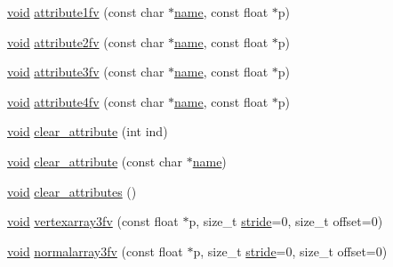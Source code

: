 \begin{DoxyCompactItemize}
\item 
\hyperlink{namespacetrimesh_a784ddfd979e1c579bda795a8edfc3f43}{void} \hyperlink{classtrimesh_1_1GLManager_aa239f5813ce742c50a82fb7c9902fbf4}{attribute1fv} (const char $\ast$\hyperlink{namespacetrimesh_a7f24cdcfa73387d7fa6aa44676238a79}{name}, const float $\ast$p)
\item 
\hyperlink{namespacetrimesh_a784ddfd979e1c579bda795a8edfc3f43}{void} \hyperlink{classtrimesh_1_1GLManager_a4305395d1301d0ae01d3b544d3be63c7}{attribute2fv} (const char $\ast$\hyperlink{namespacetrimesh_a7f24cdcfa73387d7fa6aa44676238a79}{name}, const float $\ast$p)
\item 
\hyperlink{namespacetrimesh_a784ddfd979e1c579bda795a8edfc3f43}{void} \hyperlink{classtrimesh_1_1GLManager_a258d943f3522bc4f7f56fb7753ca2481}{attribute3fv} (const char $\ast$\hyperlink{namespacetrimesh_a7f24cdcfa73387d7fa6aa44676238a79}{name}, const float $\ast$p)
\item 
\hyperlink{namespacetrimesh_a784ddfd979e1c579bda795a8edfc3f43}{void} \hyperlink{classtrimesh_1_1GLManager_a25735b968aab7781017f2079c528f1d2}{attribute4fv} (const char $\ast$\hyperlink{namespacetrimesh_a7f24cdcfa73387d7fa6aa44676238a79}{name}, const float $\ast$p)
\item 
\hyperlink{namespacetrimesh_a784ddfd979e1c579bda795a8edfc3f43}{void} \hyperlink{classtrimesh_1_1GLManager_a4f6d222a1802de5689b699bcecdb0234}{clear\+\_\+attribute} (int ind)
\item 
\hyperlink{namespacetrimesh_a784ddfd979e1c579bda795a8edfc3f43}{void} \hyperlink{classtrimesh_1_1GLManager_a6d621bfc7b0b4209eb5d3be5717875b9}{clear\+\_\+attribute} (const char $\ast$\hyperlink{namespacetrimesh_a7f24cdcfa73387d7fa6aa44676238a79}{name})
\item 
\hyperlink{namespacetrimesh_a784ddfd979e1c579bda795a8edfc3f43}{void} \hyperlink{classtrimesh_1_1GLManager_ade0105c73b84fea0caafb18bd768c9b8}{clear\+\_\+attributes} ()
\item 
\hyperlink{namespacetrimesh_a784ddfd979e1c579bda795a8edfc3f43}{void} \hyperlink{classtrimesh_1_1GLManager_a1cc34fa2ba7c5c3febdd284af01e88be}{vertexarray3fv} (const float $\ast$p, size\+\_\+t \hyperlink{namespacetrimesh_adbcc86014e77656be1a9df7ecaae5f2f}{stride}=0, size\+\_\+t offset=0)
\item 
\hyperlink{namespacetrimesh_a784ddfd979e1c579bda795a8edfc3f43}{void} \hyperlink{classtrimesh_1_1GLManager_a7a9fce4c004775be7a49e8a748134882}{normalarray3fv} (const float $\ast$p, size\+\_\+t \hyperlink{namespacetrimesh_adbcc86014e77656be1a9df7ecaae5f2f}{stride}=0, size\+\_\+t offset=0)

\end{DoxyCompactItemize}
